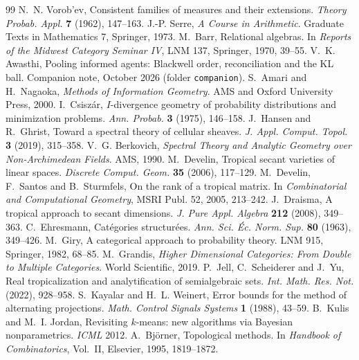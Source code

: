 \documentclass[11pt]{article}
\theoremstyle{definition}
\begin{document}
\begin{thebibliography}{99}
 N.~N. Vorob'ev, Consistent families of measures and their extensions. \emph{Theory Probab. Appl.} \textbf{7}
  (1962), 147--163.
 J.-P. Serre, \emph{A Course in Arithmetic}. Graduate Texts in Mathematics 7, Springer, 1973.
 M.~Barr, Relational algebras. In \emph{Reports of the Midwest Category Seminar IV}, LNM 137, Springer, 1970, 39--55.
 V.~K. Awasthi, Pooling informed agents: Blackwell order, reconciliation and the KL ball. Companion note,
  October 2026 (folder \texttt{companion}).
 S.~Amari and H.~Nagaoka, \emph{Methods of Information Geometry}. AMS and Oxford University Press, 2000.
 I.~Csisz\'ar, $I$-divergence geometry of probability distributions and minimization problems. \emph{Ann. Probab.}
  \textbf{3} (1975), 146--158.
 J.~Hansen and R.~Ghrist, Toward a spectral theory of cellular sheaves. \emph{J. Appl. Comput. Topol.}
  \textbf{3} (2019), 315--358.
 V.~G. Berkovich, \emph{Spectral Theory and Analytic Geometry over Non-Archimedean Fields}. AMS, 1990.
 M.~Develin, Tropical secant varieties of linear spaces. \emph{Discrete Comput. Geom.} \textbf{35} (2006), 117--129.
 M.~Develin, F.~Santos and B.~Sturmfels, On the rank of a tropical matrix. In \emph{Combinatorial and
Computational Geometry}, MSRI Publ. 52, 2005, 213--242.
 J.~Draisma, A tropical approach to secant dimensions. \emph{J. Pure Appl. Algebra} \textbf{212} (2008), 349--363.
 C.~Ehresmann, Cat\'egories structur\'ees. \emph{Ann. Sci. \'Ec. Norm. Sup.} \textbf{80} (1963), 349--426.
 M.~Giry, A categorical approach to probability theory. LNM 915, Springer, 1982, 68--85.
 M.~Grandis, \emph{Higher Dimensional Categories: From Double to Multiple Categories}. World Scientific, 2019.
 P.~Jell, C.~Scheiderer and J.~Yu, Real tropicalization and analytification of semialgebraic sets.
\emph{Int. Math. Res. Not.} (2022), 928--958.
 S.~Kayalar and H.~L. Weinert, Error bounds for the method of alternating projections. \emph{Math. Control
Signals Systems} \textbf{1} (1988), 43--59.
 B.~Kulis and M.~I. Jordan, Revisiting $k$-means: new algorithms via Bayesian nonparametrics. \emph{ICML} 2012.
 A.~Bj\"orner, Topological methods. In \emph{Handbook of Combinatorics}, Vol.~II, Elsevier, 1995, 1819--1872.

\end{thebibliography}
\end{document}
